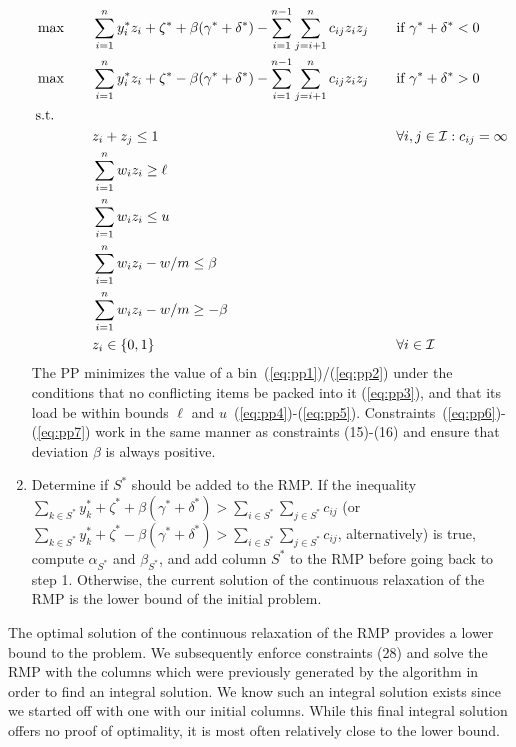 \documentclass{llncs}
\begin{document}
\begin{enumerate}
\begin{alignat}{3}
  & \max \quad && \sum \limits_{i=1}^{n} y_{i}^{*}z_{i} + \zeta^{*} + \beta(\gamma^{*}+\delta^{*}) - \sum \limits_{i=1}^{n-1} \sum \limits_{j=i+1}^{n} c_{ij} z_{i} z_{j} && \quad \text{if } \gamma^{*}+\delta^{*}<0 \label{eq:pp1} \\
  & \max \quad && \sum \limits_{i=1}^{n} y_{i}^{*}z_{i} + \zeta^{*} - \beta(\gamma^{*}+\delta^{*}) - \sum \limits_{i=1}^{n-1} \sum \limits_{j=i+1}^{n} c_{ij} z_{i} z_{j} && \quad \text{if } \gamma^{*}+\delta^{*}>0 \label{eq:pp2} \\
  &\textrm{s.t.} \notag \\
  &&& z_{i} + z_{j} \leq 1 && \quad \forall i,j \in \mathcal{I}:c_{ij}=\infty \label{eq:pp3} \\
  &&& \sum \limits_{i=1}^{n} w_{i} z_{i} \geq \ell && \label{eq:pp4} \\
  &&& \sum \limits_{i=1}^{n} w_{i} z_{i} \leq u && \label{eq:pp5} \\
  &&& \sum \limits_{i=1}^{n} w_{i} z_{i} - w/m \leq \beta && \label{eq:pp6} \\
  &&& \sum \limits_{i=1}^{n} w_{i} z_{i} - w/m \geq -\beta && \label{eq:pp7} \\
  &&& z_{i} \in \{0, 1\} && \quad \forall i \in \mathcal{I} \label{eq:pp8} 
\end{alignat}
The PP minimizes the value of a bin~(\ref{eq:pp1})/(\ref{eq:pp2}) under the conditions that no conflicting items be packed into it (\ref{eq:pp3}), and that its load be within bounds $\ell$ and $u$~(\ref{eq:pp4})-(\ref{eq:pp5}). Constraints~(\ref{eq:pp6})-(\ref{eq:pp7}) work in the same manner as constraints (15)-(16) and ensure that deviation $\beta$ is always positive.
\item Determine if $S^{*}$ should be added to the RMP. If the inequality $\sum_{k \in S^{*}} y_{k}^{*} + \zeta^{*} + \beta(\gamma^{*}+\delta^{*}) > \sum_{i \in S^{*}} \sum_{j \in S^{*}} c_{ij}$ (or $\sum_{k \in S^{*}} y_{k}^{*} + \zeta^{*} - \beta(\gamma^{*}+\delta^{*}) > \sum_{i \in S^{*}} \sum_{j \in S^{*}} c_{ij}$, alternatively) is true, compute $\alpha_{S^{*}}$ and $\beta_{S^{*}}$, and add column $S^{*}$ to the RMP before going back to step 1. Otherwise, the current solution of the continuous relaxation of the RMP is the lower bound of the initial problem.
\end{enumerate}

The optimal solution of the continuous relaxation of the RMP provides a lower bound to the problem. We subsequently enforce constraints (28) and solve the RMP with the columns which were previously generated by the algorithm in order to find an integral solution. We know such an integral solution exists since we started off with one with our initial columns. While this final integral solution offers no proof of optimality, it is most often relatively close to the lower bound.
\end{document}
